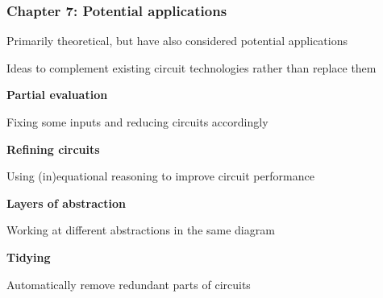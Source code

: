 \begin{frame}
    \frametitle{Chapter 7: Potential applications}

    \pause

    Primarily \alert{theoretical}, but have also considered potential
    \alert{applications}

    \pause

    Ideas to \alert{complement} existing circuit technologies rather than
    \alert{replace} them

    \large
    \vspace{0.5em}

    \pause

    \begin{center}
        \begin{minipage}{0.45\textwidth}
            \textbf{Partial evaluation}
            \centering

            \vspace{0.25em}

            Fixing some inputs and reducing circuits accordingly

        \end{minipage}
        \quad\pause
        \begin{minipage}{0.45\textwidth}
            \centering
            \textbf{Refining circuits}

            \vspace{0.25em}

            Using (in)equational reasoning to improve circuit performance
        \end{minipage}

        \pause
        \vspace{1em}

        \begin{minipage}{0.45\textwidth}
            \centering
            \textbf{Layers of abstraction}

            \vspace{0.25em}

            Working at different abstractions in the same diagram
        \end{minipage}
        \quad\pause
        \begin{minipage}{0.45\textwidth}
            \centering
            \textbf{Tidying}

            \vspace{0.25em}

            Automatically remove redundant parts of circuits

        \end{minipage}
    \end{center}

\end{frame}

